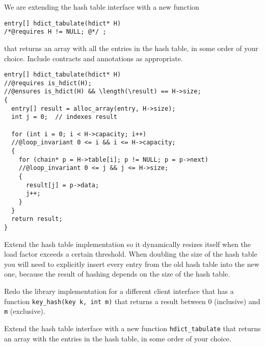 \begin{flex}
\begin{exercise}%
\label{ex:hdict_tabulate}
We are extending the hash table interface with a new function
\begin{lstlisting}[language={[C0]C}]
entry[] hdict_tabulate(hdict* H)
/*@requires H != NULL; @*/ ;
\end{lstlisting}
that returns an array with all the entries in the hash table, in some
order of your choice.  Include contracts and annotations as appropriate.
\end{exercise}

\begin{solution}
\label{ex:hdict_tabulate-solved}
\begin{lstlisting}[language={[C0]C}]
entry[] hdict_tabulate(hdict* H)
//@requires is_hdict(H);
//@ensures is_hdict(H) && \length(\result) == H->size;
{
  entry[] result = alloc_array(entry, H->size);
  int j = 0;  // indexes result

  for (int i = 0; i < H->capacity; i++)
  //@loop_invariant 0 <= i && i <= H->capacity;
  {
    for (chain* p = H->table[i]; p != NULL; p = p->next)
    //@loop_invariant 0 <= j && j <= H->size;
    {
      result[j] = p->data;
      j++;
    }
  }
  return result;
}
\end{lstlisting}
\end{solution}
\end{flex}


\begin{exercise}
  Extend the hash table implementation so it dynamically resizes
  itself when the load factor exceeds a certain threshold.  When
  doubling the size of the hash table you will need to explicitly
  insert every entry from the old hash table into the new one,
  because the result of hashing depends on the size of the hash table.
\end{exercise}

\begin{exercise}
  Redo the library implementation for a different client interface
  that has a function \lstinline'key_hash(key k, int m)' that returns
  a result between 0 (inclusive) and \lstinline'm' (exclusive).
\end{exercise}

\begin{exercise}
  Extend the hash table interface with a new function
  \lstinline'hdict_tabulate' that returns an array with the entries in
  the hash table, in some order of your choice.
\end{exercise}


